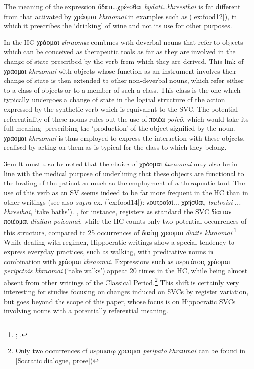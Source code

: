 \documentclass[output=paper,colorlinks,citecolor=brown]{langscibook}
\begin{document}
The meaning of the expression ὕδατι…χρέεσθαι \textit{hydati…khreesthai} is far different from that activated by χράομαι \textit{khraomai} in examples such as (\ref{ex:food12}), in which it prescribes the ‘drinking’ of wine and not its use for other purposes. 

In the HC χράομαι \textit{khraomai} combines with deverbal nouns that refer to objects which can be conceived as therapeutic tools as far as they are involved in the change of state prescribed by the verb from which they are derived. This link of χράομαι \textit{khraomai} with objects whose function as an instrument involves their change of state is then extended to other non-deverbal nouns, which refer either to a class of objects or to a member of such a class. This class is the one which typically undergoes a change of state in the logical structure of the action expressed by the synthetic verb which is equivalent to the SVC. The potential referentiality of these nouns rules out the use of ποιέω \textit{poieō}, which would take its full meaning, prescribing the ‘production’ of the object signified by the noun. χράομαι \textit{khraomai} is thus employed to express the interaction with these objects, realised by acting on them as is typical for the class to which they belong. 

\emergencystretch 3em 
It must also be noted that the choice of χράομαι \textit{khraomai} may also be in line with the medical purpose of underlining that these objects are functional to the healing of the patient as much as the employment of a therapeutic tool. The use of this verb as an SV seems indeed to be far more frequent in the HC than in other writings (see also \textit{supra} ex. (\ref{ex:food14}): λουτροῖσί... χρῆσθαι, \textit{loutroisi ... khrēsthai}, ‘take baths'). \citet{JiménezLópez2011}, for instance, registers as standard the SVC δίαιταν ποιέομαι \textit{diaitan poieomai}, while the HC counts only two potential occurrences of this structure, compared to 25 occurrences of διαίτῃ χράομαι \textit{diaitē khraomai}.\footnote{; .} While dealing with regimen, Hippocratic writings show a special tendency to express everyday practices, such as walking, with predicative nouns in combination with χράομαι \textit{khraomai}. Expressions such as περιπάτοις χράομαι \textit{peripatois khraomai} (‘take walks’) appear 20 times in the HC, while being almost absent from other writings of the Classical Period.\footnote{Only two occurrences of περιπάτῳ χράομαι \textit{peripatō khraοmai} can be found in  [Socratic dialogue, prose])} This shift is certainly very interesting for studies focusing on changes induced on SVCs by register variation, but goes beyond the scope of this paper, whose focus is on Hippocratic SVCs involving nouns with a potentially referential meaning.
\end{document}
